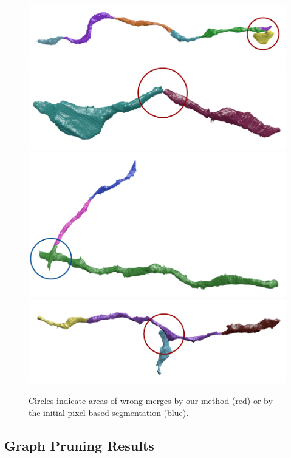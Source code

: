 \begin{figure}[t]
	\centering
	\includegraphics[width=0.85\linewidth]{./figures/VI-results/multicut-incorrect1.png}
	\includegraphics[width=0.85\linewidth]{./figures/VI-results/multicut-incorrect2.png}
	\includegraphics[width=0.85\linewidth]{./figures/VI-results/multicut-incorrect3.png}
	\includegraphics[width=0.85\linewidth]{./figures/VI-results/multicut-incorrect4.png}
	\caption{Circles indicate areas of wrong merges by our method (red) or by the initial pixel-based segmentation (blue).}
	\label{fig:negative-results}
\end{figure}


\subsection{Graph Pruning Results}



